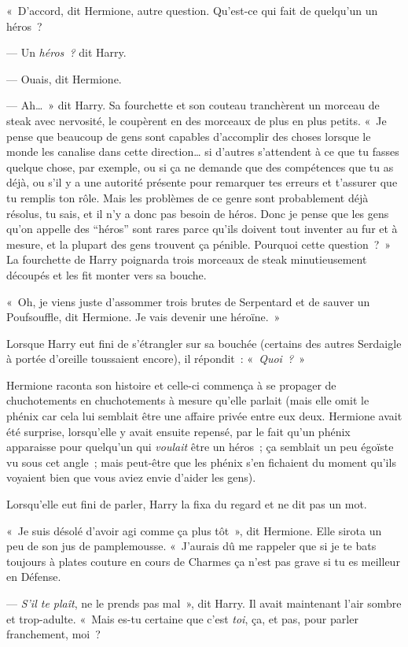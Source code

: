 «~D'accord, dit Hermione, autre question. Qu'est-ce qui fait de quelqu'un un héros~?

--- Un \emph{héros~?} dit Harry.

--- Ouais, dit Hermione.

--- Ah…~» dit Harry. Sa fourchette et son couteau tranchèrent un morceau de steak avec nervosité, le coupèrent en des morceaux de plus en plus petits. «~Je pense que beaucoup de gens sont capables d'accomplir des choses lorsque le monde les canalise dans cette direction… si d'autres s'attendent à ce que tu fasses quelque chose, par exemple, ou si ça ne demande que des compétences que tu as déjà, ou s'il y a une autorité présente pour remarquer tes erreurs et t'assurer que tu remplis ton rôle. Mais les problèmes de ce genre sont probablement déjà résolus, tu sais, et il n'y a donc pas besoin de héros. Donc je pense que les gens qu'on appelle des “héros” sont rares parce qu'ils doivent tout inventer au fur et à mesure, et la plupart des gens trouvent ça pénible. Pourquoi cette question~?~» La fourchette de Harry poignarda trois morceaux de steak minutieusement découpés et les fit monter vers sa bouche.

«~Oh, je viens juste d'assommer trois brutes de Serpentard et de sauver un Poufsouffle, dit Hermione. Je vais devenir une héroïne.~»

Lorsque Harry eut fini de s'étrangler sur sa bouchée (certains des autres Serdaigle à portée d'oreille toussaient encore), il répondit~: «~\emph{Quoi~?}~»

Hermione raconta son histoire et celle-ci commença à se propager de chuchotements en chuchotements à mesure qu'elle parlait (mais elle omit le phénix car cela lui semblait être une affaire privée entre eux deux. Hermione avait été surprise, lorsqu'elle y avait ensuite repensé, par le fait qu'un phénix apparaisse pour quelqu'un qui \emph{voulait} être un héros~; ça semblait un peu égoïste vu sous cet angle~; mais peut-être que les phénix s'en fichaient du moment qu'ils voyaient bien que vous aviez envie d'aider les gens).

Lorsqu'elle eut fini de parler, Harry la fixa du regard et ne dit pas un mot.

«~Je suis désolé d'avoir agi comme ça plus tôt~», dit Hermione. Elle sirota un peu de son jus de pamplemousse. «~J'aurais dû me rappeler que si je te bats toujours à plates couture en cours de Charmes ça n'est pas grave si tu es meilleur en Défense.

--- \emph{S'il te plaît}, ne le prends pas mal~», dit Harry. Il avait maintenant l'air sombre et trop-adulte. «~Mais es-tu certaine que c'est \emph{toi}, ça, et pas, pour parler franchement, moi~?

